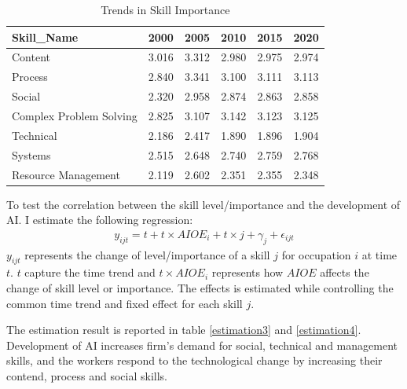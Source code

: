 \documentclass[12pt]{article}
\begin{document}
\begin{table}
\center
\scriptsize
\caption{Trends in Skill Importance}
\label{IM_trend}
\begin{tabular}{lccccc} \hline \hline
Skill\_Name & 2000 & 2005 & 2010 & 2015 & 2020 \\ \hline
Content & 3.016 & 3.312 & 2.980 & 2.975 & 2.974 \\
Process & 2.840 & 3.341 & 3.100 & 3.111 & 3.113 \\
Social & 2.320 & 2.958 & 2.874 & 2.863 & 2.858 \\
Complex Problem Solving & 2.825 & 3.107 & 3.142 & 3.123 & 3.125 \\
Technical & 2.186 & 2.417 & 1.890 & 1.896 & 1.904 \\
Systems & 2.515 & 2.648 & 2.740 & 2.759 & 2.768 \\
Resource Management & 2.119 & 2.602 & 2.351 & 2.355 & 2.348 \\ \hline
\end{tabular}
\end{table}

To test the correlation between the skill level/importance and the development of AI. I estimate the following regression: 
\begin{align*}
y_{ijt} = t + t \times AIOE_{i} + t \times j + \gamma_j + \epsilon_{ijt}
\end{align*}
$y_{ijt}$ represents the change of level/importance of a skill $j$ for occupation $i$ at time $t$. $t$ capture the time trend and $t\times AIOE_{i}$ represents how $AIOE$ affects the change of skill level or importance. The effects is estimated while controlling the common time trend and fixed effect for each skill $j$.

The estimation result is reported in table \ref{estimation3} and \ref{estimation4}. Development of AI increases firm's demand for social, technical and management skills, and the workers respond to the technological change by increasing their contend, process and social skills. 
\end{document}
